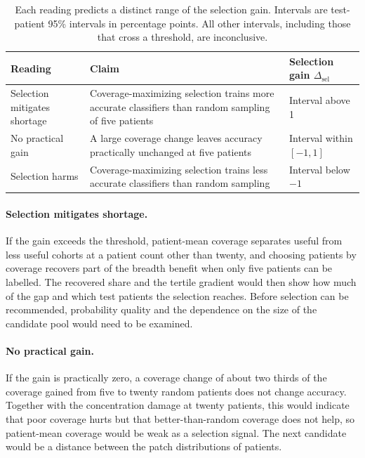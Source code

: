 \documentclass[11pt]{article}
\begin{document}
\begin{table}[htbp]
\centering
\renewcommand{\arraystretch}{1.15}
\begin{tabularx}{\textwidth}{@{}lYY@{}}
\toprule
Reading & Claim & Selection gain $\Delta_{\mathrm{sel}}$ \\
\midrule
Selection mitigates shortage & Coverage-maximizing selection trains more accurate classifiers than random sampling of five patients & Interval above 1 \\
\addlinespace
No practical gain & A large coverage change leaves accuracy practically unchanged at five patients & Interval within $[-1,1]$ \\
\addlinespace
Selection harms & Coverage-maximizing selection trains less accurate classifiers than random sampling & Interval below $-1$ \\
\bottomrule
\end{tabularx}
\caption{Each reading predicts a distinct range of the selection gain. Intervals are test-patient 95\% intervals in percentage points. All other intervals, including those that cross a threshold, are inconclusive.}
\label{tab:readings}
\end{table}

\paragraph{Selection mitigates shortage.}
If the gain exceeds the threshold, patient-mean coverage separates useful from less useful cohorts at a patient count other than twenty, and choosing patients by coverage recovers part of the breadth benefit when only five patients can be labelled. The recovered share and the tertile gradient would then show how much of the gap and which test patients the selection reaches. Before selection can be recommended, probability quality and the dependence on the size of the candidate pool would need to be examined.

\paragraph{No practical gain.}
If the gain is practically zero, a coverage change of about two thirds of the coverage gained from five to twenty random patients does not change accuracy. Together with the concentration damage at twenty patients, this would indicate that poor coverage hurts but that better-than-random coverage does not help, so patient-mean coverage would be weak as a selection signal. The next candidate would be a distance between the patch distributions of patients.
\end{document}
